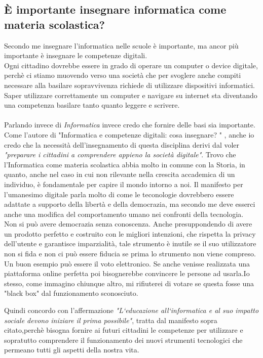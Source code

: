 \documentclass[a4paper]{article}
\begin{document}
\subsection{È importante insegnare informatica come materia scolastica?}
Secondo me insegnare l'informatica nelle scuole è importante, ma ancor più importante è insegnare le competenze digitali.\\
Ogni cittadino dovrebbe essere in grado di operare un computer o device digitale, perchè ci stiamo muovendo verso una società che per svoglere anche compiti necessare alla basilare sopravvivenza richiede di utilizzare dispositivi informatici. Saper utilizzare correttamente un computer e navigare su internet sta diventando una competenza basilare tanto quanto leggere e scrivere.\\
\\
Parlando invece di \emph{Informatica} invece credo che fornire delle basi sia importante.\\
Come l'autore di "Informatica e competenze digitali: cosa insegnare? "\cite{insegnare} , anche io credo che la necessità dell'insegnamento di questa disciplina derivi dal voler \emph{"preparare i cittadini a comprendere appieno la società digitale"}.
Trovo che l'Informatica come materia scolastica abbia molto in comune con la Storia, in quanto, anche nel caso in cui non rilevante nella crescita accademica di un individuo, è fondamentale per capire il mondo intorno a noi. Il manifesto per l'umanesimo digitale\cite{umanesimo} parla molto di come le teconologie dovrebbero essere adattate a supporto della libertà e della democrazia, ma secondo me deve esserci anche una modifica del comportamento umano nei confronti della tecnologia.\\
Non si può avere democrazia senza conoscenza. Anche presuppondendo di avere un prodotto perfetto e costruito con le migliori intenzioni, che rispetta la privacy dell'utente e garantisce imparzialità, tale strumento è inutile se il suo utilizzatore non si fida e non ci può essere fiducia se prima lo strumento non viene compreso.
Un buon esempio può essere il voto elettronico. Se anche venisse realizzata una piattaforma online perfetta poi bisognerebbe convincere le persone ad usarla.Io stesso, come immagino chiunque altro, mi rifiuterei di votare se questa fosse una "black box" dal funzionamento sconosciuto.

Quindi concordo con l'affermazione \emph{"L‘educazione all‘informatica e al suo impatto sociale devono iniziare il prima possibile"}, tratta dal manifesto sopra citato,perchè bisogna fornire ai futuri cittadini le competenze per utilizzare e sopratutto comprendere il funzionamento dei nuovi strumenti tecnologici che permeano tutti gli aspetti della nostra vita.
\end{document}
